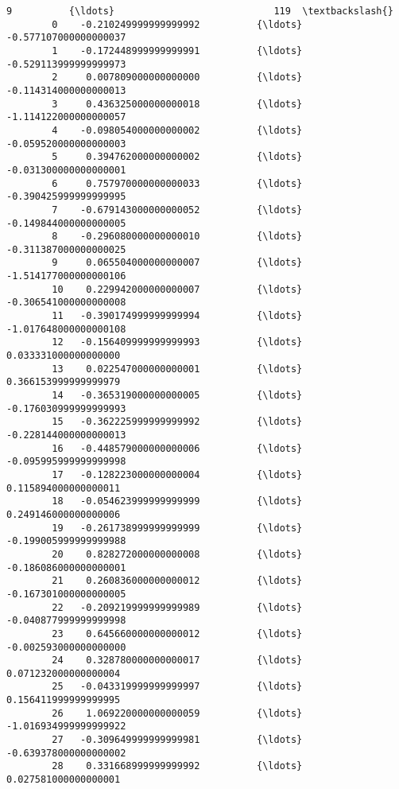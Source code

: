 \documentclass[11pt]{article}
\begin{document}
\begin{Verbatim}[commandchars=\\\{\}]
                                 9          {\ldots}                            119  \textbackslash{}
        0    -0.210249999999999992          {\ldots}          -0.577107000000000037   
        1    -0.172448999999999991          {\ldots}          -0.529113999999999973   
        2     0.007809000000000000          {\ldots}          -0.114314000000000013   
        3     0.436325000000000018          {\ldots}          -1.114122000000000057   
        4    -0.098054000000000002          {\ldots}          -0.059520000000000003   
        5     0.394762000000000002          {\ldots}          -0.031300000000000001   
        6     0.757970000000000033          {\ldots}          -0.390425999999999995   
        7    -0.679143000000000052          {\ldots}          -0.149844000000000005   
        8    -0.296080000000000010          {\ldots}          -0.311387000000000025   
        9     0.065504000000000007          {\ldots}          -1.514177000000000106   
        10    0.229942000000000007          {\ldots}          -0.306541000000000008   
        11   -0.390174999999999994          {\ldots}          -1.017648000000000108   
        12   -0.156409999999999993          {\ldots}           0.033331000000000000   
        13    0.022547000000000001          {\ldots}           0.366153999999999979   
        14   -0.365319000000000005          {\ldots}          -0.176030999999999993   
        15   -0.362225999999999992          {\ldots}          -0.228144000000000013   
        16   -0.448579000000000006          {\ldots}          -0.095995999999999998   
        17   -0.128223000000000004          {\ldots}           0.115894000000000011   
        18   -0.054623999999999999          {\ldots}           0.249146000000000006   
        19   -0.261738999999999999          {\ldots}          -0.199005999999999988   
        20    0.828272000000000008          {\ldots}          -0.186086000000000001   
        21    0.260836000000000012          {\ldots}          -0.167301000000000005   
        22   -0.209219999999999989          {\ldots}          -0.040877999999999998   
        23    0.645660000000000012          {\ldots}          -0.002593000000000000   
        24    0.328780000000000017          {\ldots}           0.071232000000000004   
        25   -0.043319999999999997          {\ldots}           0.156411999999999995   
        26    1.069220000000000059          {\ldots}          -1.016934999999999922   
        27   -0.309649999999999981          {\ldots}          -0.639378000000000002   
        28    0.331668999999999992          {\ldots}           0.027581000000000001   

\end{Verbatim}
\end{document}
